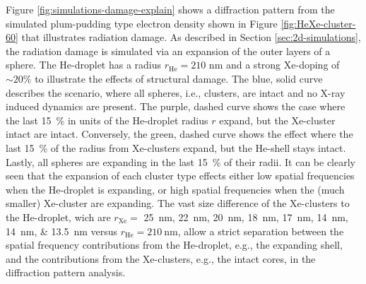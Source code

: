 Figure \ref{fig:simulations-damage-explain} shows a diffraction pattern from the simulated plum-pudding type electron density shown in Figure \ref{fig:HeXe-cluster-60} that illustrates radiation damage. As described in Section \ref{sec:2d-simulations}, the radiation damage is simulated via an expansion of the outer layers of a sphere. The He-droplet has a radius $r_{\text{He}}=210$ nm and a strong Xe-doping of $\sim 20 \%$ to illustrate the effects of structural damage. The blue, solid curve describes the scenario, where all spheres, i.e., clusters, are intact and no X-ray induced dynamics are present. The purple, dashed curve shows the case where the last \SI{15}{\percent} in units of the He-droplet radius $r$ expand, but the Xe-cluster intact are intact. Conversely, the green, dashed curve shows the effect where the last \SI{15}{\percent} of the radius from Xe-clusters expand, but the He-shell stays intact. Lastly, all spheres are expanding in the last \SI{15}{\percent} of their radii. It can be clearly seen that the expansion of each cluster type effects either low spatial frequencies when the He-droplet is expanding, or high spatial frequencies when the (much smaller) Xe-cluster are expanding. The vast size difference of the Xe-clusters to the He-droplet, wich are $r_{\text{Xe}}=$ \SIlist{25;22;20;18;17;14;14;13.5}{\nano\meter} versus $r_{\text{He}}=\SI{210}{\nano\meter}$, allow a strict separation between the spatial frequency contributions from the He-droplet, e.g., the expanding shell, and the contributions from the Xe-clusters, e.g., the intact cores, in the diffraction pattern analysis.\\[1\baselineskip]
